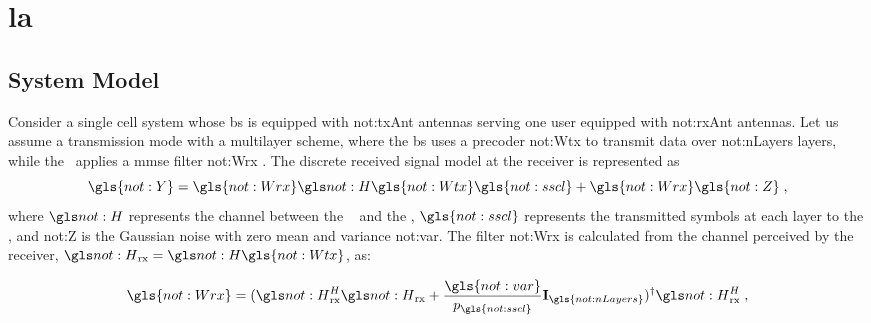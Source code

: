 \chapter{\Acl{la}} \label{chp:la}




\section{System Model}
\label{sec:la-system-model}

Consider a single cell system whose \gls{bs} is equipped with \gls{not:txAnt} antennas serving one user equipped with \gls{not:rxAnt} antennas.
%
Let us assume a transmission mode with a multilayer scheme, where the \gls{bs} uses a precoder \gls{not:Wtx}  to transmit data over  \gls{not:nLayers} layers, while the \ue~applies a \gls{mmse} filter \gls{not:Wrx} .
%
The discrete received signal model at the receiver is represented as
\begin{equation}
\label{eq.:rx_signal}
\gls{not:Y} =
\gls{not:Wrx}
\channel
\gls{not:Wtx}
\gls{not:sscl}
+
\gls{not:Wrx}
\gls{not:Z} \;,
\end{equation}
\noindent where $\channel $  represents the channel between the \base~ and the \ue, $\gls{not:sscl}$ represents the transmitted symbols at each layer to the \ue, and \gls{not:Z} is the Gaussian noise with zero mean and variance \gls{not:var}.
%
The filter \gls{not:Wrx} is calculated from the channel perceived by the receiver, $\channel_{\textrm{rx}} = \channel \gls{not:Wtx}$, as:

\begin{equation}
\label{eq.:Wrx}
\gls{not:Wrx} =
(
\channel_{\textrm{rx}}^H
\channel_{\textrm{rx}}
+
\frac{ \gls{not:var} }{ p_{\gls{not:sscl}} }
\mathbf{I}_{\gls{not:nLayers}} )^\dagger
\channel_{\textrm{rx}}^H \;,
\end{equation}

